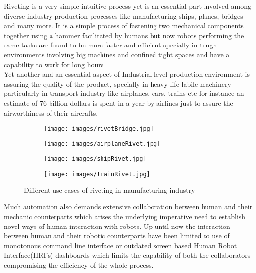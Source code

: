 \documentclass{article}
\begin{document}
Riveting is a very simple intuitive process yet is an essential part involved among diverse industry production processes like manufacturing ships, planes, bridges and many more. It is a simple process of fastening two mechanical components together using a hammer facilitated by humans but now robots performing the same tasks are found to be more faster and efficient specially in tough environments involving big machines and confined tight spaces and have a capability to work for long hours\\

Yet another and an essential aspect of Industrial level production environment is assuring the quality of the product, specially in heavy life labile machinery particularly in transport industry like airplanes, cars, trains etc for instance an estimate of 76 billion dollars is spent in a year by airlines just to assure the airworthiness of their aircrafts.\cite{IATA}



\begin{figure}
    \centering
  \begin{subfigure}
    \centering\texttt{[image: images/rivetBridge.jpg]}
  \end{subfigure}
  \begin{subfigure}
    \centering\texttt{[image: images/airplaneRivet.jpg]}
  \end{subfigure}
 
  \begin{subfigure}
    \centering\texttt{[image: images/shipRivet.jpg]}
  \end{subfigure}
  \begin{subfigure}
    \centering\texttt{[image: images/trainRivet.jpg]}
  \end{subfigure}
  \caption{Different use cases of riveting in manufacturing industry  }
\end{figure}

Much automation also demands extensive collaboration between human and their mechanic counterparts which arises the underlying imperative need to establish novel ways of human interaction with robots. Up until now the interaction between human and their robotic counterparts have been limited to use of monotonous command line interface or outdated screen based Human Robot Interface(HRI's) dashboards which limits the capability of both the collaborators compromising the efficiency of the whole process.\\
 
\end{document}
